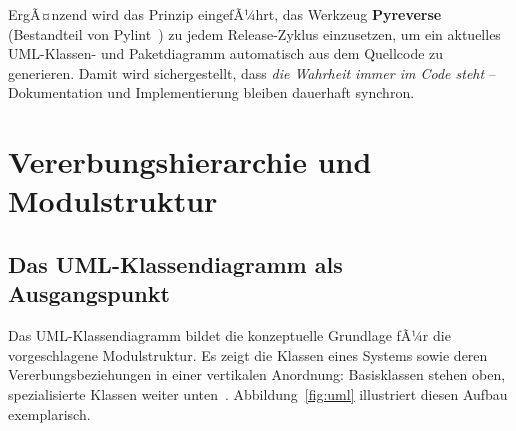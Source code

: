 ﻿\documentclass[a4paper,12pt]{article}
\begin{document}
ErgÃ¤nzend wird das Prinzip eingefÃ¼hrt, das Werkzeug \textbf{Pyreverse}
(Bestandteil von Pylint~\cite{pylint2024}) zu jedem Release-Zyklus einzusetzen,
um ein aktuelles UML-Klassen- und Paketdiagramm automatisch aus dem Quellcode
zu generieren. Damit wird sichergestellt, dass \textit{die Wahrheit immer im Code
	steht} -- Dokumentation und Implementierung bleiben dauerhaft synchron.

\section{Vererbungshierarchie und Modulstruktur}

\subsection{Das UML-Klassendiagramm als Ausgangspunkt}

Das UML-Klassendiagramm bildet die konzeptuelle Grundlage fÃ¼r die vorgeschlagene
Modulstruktur. Es zeigt die Klassen eines Systems sowie deren Vererbungsbeziehungen
in einer vertikalen Anordnung: Basisklassen stehen oben, spezialisierte Klassen
weiter unten~\cite{omg2017}. Abbildung~\ref{fig:uml} illustriert diesen Aufbau
exemplarisch.
\end{document}
